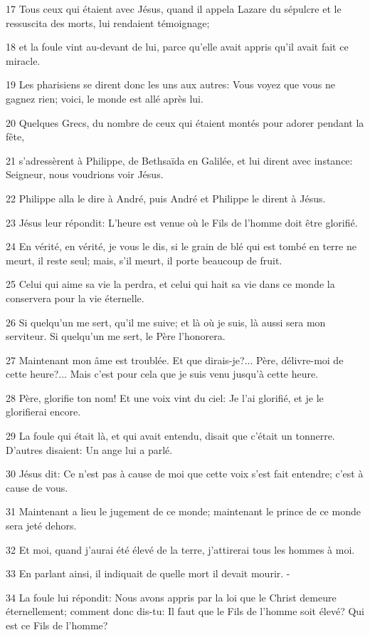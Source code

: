 \par 17 Tous ceux qui étaient avec Jésus, quand il appela Lazare du sépulcre et le ressuscita des morts, lui rendaient témoignage;
\par 18 et la foule vint au-devant de lui, parce qu'elle avait appris qu'il avait fait ce miracle.
\par 19 Les pharisiens se dirent donc les uns aux autres: Vous voyez que vous ne gagnez rien; voici, le monde est allé après lui.
\par 20 Quelques Grecs, du nombre de ceux qui étaient montés pour adorer pendant la fête,
\par 21 s'adressèrent à Philippe, de Bethsaïda en Galilée, et lui dirent avec instance: Seigneur, nous voudrions voir Jésus.
\par 22 Philippe alla le dire à André, puis André et Philippe le dirent à Jésus.
\par 23 Jésus leur répondit: L'heure est venue où le Fils de l'homme doit être glorifié.
\par 24 En vérité, en vérité, je vous le dis, si le grain de blé qui est tombé en terre ne meurt, il reste seul; mais, s'il meurt, il porte beaucoup de fruit.
\par 25 Celui qui aime sa vie la perdra, et celui qui hait sa vie dans ce monde la conservera pour la vie éternelle.
\par 26 Si quelqu'un me sert, qu'il me suive; et là où je suis, là aussi sera mon serviteur. Si quelqu'un me sert, le Père l'honorera.
\par 27 Maintenant mon âme est troublée. Et que dirais-je?... Père, délivre-moi de cette heure?... Mais c'est pour cela que je suis venu jusqu'à cette heure.
\par 28 Père, glorifie ton nom! Et une voix vint du ciel: Je l'ai glorifié, et je le glorifierai encore.
\par 29 La foule qui était là, et qui avait entendu, disait que c'était un tonnerre. D'autres disaient: Un ange lui a parlé.
\par 30 Jésus dit: Ce n'est pas à cause de moi que cette voix s'est fait entendre; c'est à cause de vous.
\par 31 Maintenant a lieu le jugement de ce monde; maintenant le prince de ce monde sera jeté dehors.
\par 32 Et moi, quand j'aurai été élevé de la terre, j'attirerai tous les hommes à moi.
\par 33 En parlant ainsi, il indiquait de quelle mort il devait mourir. -
\par 34 La foule lui répondit: Nous avons appris par la loi que le Christ demeure éternellement; comment donc dis-tu: Il faut que le Fils de l'homme soit élevé? Qui est ce Fils de l'homme?
